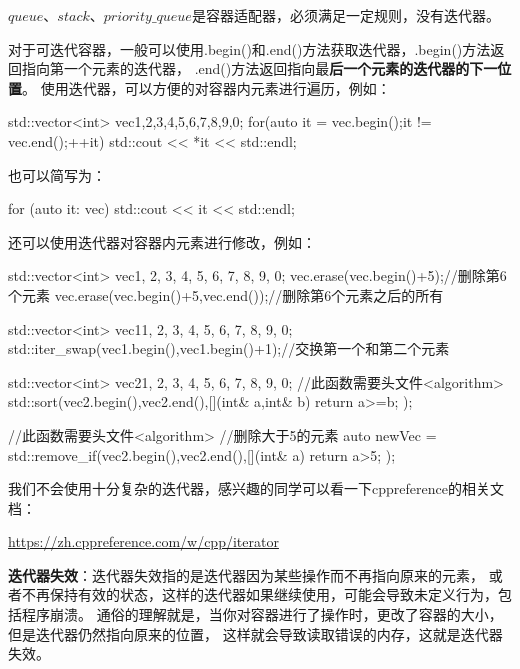 $queue$、$stack$、$priority\_queue$是容器适配器，必须满足一定规则，没有迭代器。

对于可迭代容器，一般可以使用.begin()和.end()方法获取迭代器，.begin()方法返回指向第一个元素的迭代器，
.end()方法返回指向最\textbf{后一个元素的迭代器的下一位置}。
使用迭代器，可以方便的对容器内元素进行遍历，例如：

\begin{tcode}
std::vector<int> vec{1,2,3,4,5,6,7,8,9,0};
for(auto it = vec.begin();it != vec.end();++it){
    std::cout << *it << std::endl;
}
\end{tcode}

也可以简写为：

\begin{tcode}
for (auto it: vec) {
    std::cout << it << std::endl;
}
\end{tcode}

还可以使用迭代器对容器内元素进行修改，例如：

\begin{tcode}
std::vector<int> vec{1, 2, 3, 4, 5, 6, 7, 8, 9, 0};
vec.erase(vec.begin()+5);//删除第6个元素
vec.erase(vec.begin()+5,vec.end());//删除第6个元素之后的所有

std::vector<int> vec1{1, 2, 3, 4, 5, 6, 7, 8, 9, 0};
std::iter_swap(vec1.begin(),vec1.begin()+1);//交换第一个和第二个元素

std::vector<int> vec2{1, 2, 3, 4, 5, 6, 7, 8, 9, 0};
//此函数需要头文件<algorithm>
std::sort(vec2.begin(),vec2.end(),[](int& a,int& b){
    return a>=b;
});

//此函数需要头文件<algorithm>
//删除大于5的元素
auto newVec = std::remove_if(vec2.begin(),vec2.end(),[](int& a){
    return a>5;
});
\end{tcode}

我们不会使用十分复杂的迭代器，感兴趣的同学可以看一下cppreference的相关文档：

\url{https://zh.cppreference.com/w/cpp/iterator}

\textbf{迭代器失效}：迭代器失效指的是迭代器因为某些操作而不再指向原来的元素，
或者不再保持有效的状态，这样的迭代器如果继续使用，可能会导致未定义行为，包括程序崩溃。
通俗的理解就是，当你对容器进行了操作时，更改了容器的大小，但是迭代器仍然指向原来的位置，
这样就会导致读取错误的内存，这就是迭代器失效。



